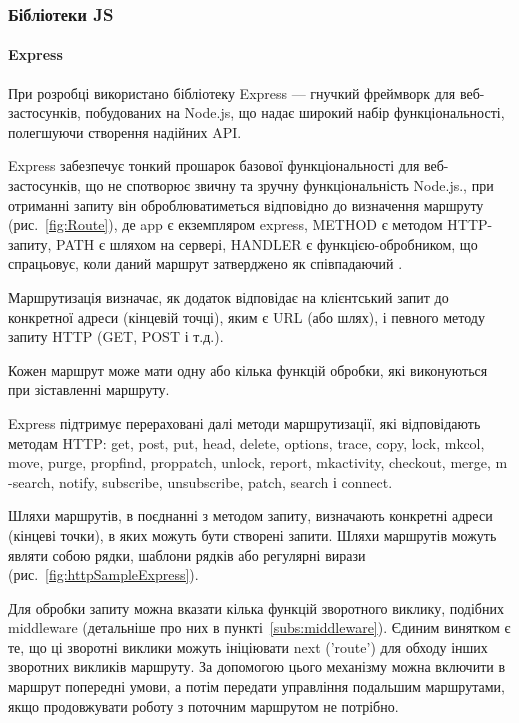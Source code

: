 \subsubsection{Бібліотеки JS}

\paragraph{Express} \label{par:Express}

При розробці використано бібліотеку Express — гнучкий фреймворк для веб-застосунків, побудованих на Node.js, що надає широкий набір функціональності, полегшуючи створення надійних API.

Express забезпечує тонкий прошарок базової функціональності для веб-застосунків, що не спотворює звичну та зручну функціональність Node.js., при отриманні запиту він оброблюватиметься відповідно до визначення маршруту (рис.~\ref{fig:Route}), де app є екземпляром express, METHOD є методом HTTP-запиту, PATH є шляхом на сервері, HANDLER є функцією-обробником, що спрацьовує, коли даний маршрут затверджено як співпадаючий \cite{hahn2016express}.

Маршрутизація визначає, як додаток відповідає на клієнтський запит до конкретної адреси (кінцевій точці), яким є URL (або шлях), і певного методу запиту HTTP (GET, POST і т.д.).

Кожен маршрут може мати одну або кілька функцій обробки, які виконуються при зіставленні маршруту.

Express підтримує перераховані далі методи маршрутизації, які відповідають методам HTTP: get, post, put, head, delete, options, trace, copy, lock, mkcol, move, purge, propfind, proppatch, unlock, report, mkactivity, checkout, merge, m -search, notify, subscribe, unsubscribe, patch, search і connect.

Шляхи маршрутів, в поєднанні з методом запиту, визначають конкретні адреси (кінцеві точки), в яких можуть бути створені запити. Шляхи маршрутів можуть являти собою рядки, шаблони рядків або регулярні вирази (рис.~\ref{fig:httpSampleExpress}).


Для обробки запиту можна вказати кілька функцій зворотного виклику, подібних middleware (детальніше про них в пункті~\ref{subs:middleware}). Єдиним винятком є те, що ці зворотні виклики можуть ініціювати next ('route') для обходу інших зворотних викликів маршруту. За допомогою цього механізму можна включити в маршрут попередні умови, а потім передати управління подальшим маршрутами, якщо продовжувати роботу з поточним маршрутом не потрібно.

